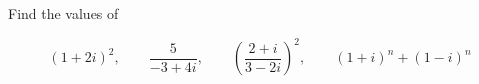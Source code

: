 Find the values of

$$(1+2i)^2, \qquad \frac{5}{-3+4i}, \qquad (\frac{2+i}{3-2i})^2, \qquad (1+i)^n+(1-i)^n$$

\begin{solution}\renewcommand{\qedsymbol}{}\ \\

    

\end{solution}
